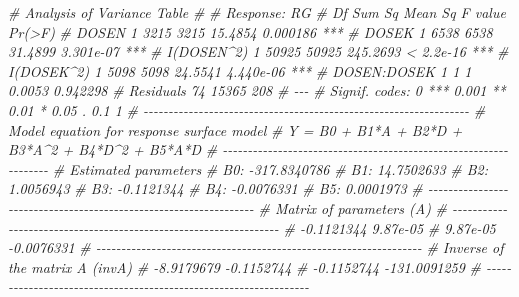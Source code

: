 \documentclass[
]{book}
\newenvironment{Shaded}{\begin{snugshade}}{\end{snugshade}}
\newcommand{\CommentTok}[1]{\textcolor[rgb]{0.56,0.35,0.01}{\textit{#1}}}
\numberwithin{equation}{section}
\begin{document}
\begin{Shaded}
\begin{Highlighting}[]
\CommentTok{\# Analysis of Variance Table}
\CommentTok{\# }
\CommentTok{\# Response: RG}
\CommentTok{\#             Df Sum Sq Mean Sq  F value    Pr(\textgreater{}F)    }
\CommentTok{\# DOSEN        1   3215    3215  15.4854  0.000186 ***}
\CommentTok{\# DOSEK        1   6538    6538  31.4899 3.301e{-}07 ***}
\CommentTok{\# I(DOSEN\^{}2)   1  50925   50925 245.2693 \textless{} 2.2e{-}16 ***}
\CommentTok{\# I(DOSEK\^{}2)   1   5098    5098  24.5541 4.440e{-}06 ***}
\CommentTok{\# DOSEN:DOSEK  1      1       1   0.0053  0.942298    }
\CommentTok{\# Residuals   74  15365     208                       }
\CommentTok{\# {-}{-}{-}}
\CommentTok{\# Signif. codes:  0 \textquotesingle{}***\textquotesingle{} 0.001 \textquotesingle{}**\textquotesingle{} 0.01 \textquotesingle{}*\textquotesingle{} 0.05 \textquotesingle{}.\textquotesingle{} 0.1 \textquotesingle{} \textquotesingle{} 1}
\CommentTok{\# {-}{-}{-}{-}{-}{-}{-}{-}{-}{-}{-}{-}{-}{-}{-}{-}{-}{-}{-}{-}{-}{-}{-}{-}{-}{-}{-}{-}{-}{-}{-}{-}{-}{-}{-}{-}{-}{-}{-}{-}{-}{-}{-}{-}{-}{-}{-}{-}{-}{-}{-}{-}{-}{-}{-}{-}{-}{-}{-}{-}{-}{-}{-}{-}{-}}
\CommentTok{\# Model equation for response surface model }
\CommentTok{\# Y = B0 + B1*A + B2*D + B3*A\^{}2 + B4*D\^{}2 + B5*A*D }
\CommentTok{\# {-}{-}{-}{-}{-}{-}{-}{-}{-}{-}{-}{-}{-}{-}{-}{-}{-}{-}{-}{-}{-}{-}{-}{-}{-}{-}{-}{-}{-}{-}{-}{-}{-}{-}{-}{-}{-}{-}{-}{-}{-}{-}{-}{-}{-}{-}{-}{-}{-}{-}{-}{-}{-}{-}{-}{-}{-}{-}{-}{-}{-}{-}{-}{-}{-}}
\CommentTok{\# Estimated parameters }
\CommentTok{\# B0: {-}317.8340786}
\CommentTok{\# B1: 14.7502633}
\CommentTok{\# B2: 1.0056943}
\CommentTok{\# B3: {-}0.1121344}
\CommentTok{\# B4: {-}0.0076331}
\CommentTok{\# B5: 0.0001973}
\CommentTok{\# {-}{-}{-}{-}{-}{-}{-}{-}{-}{-}{-}{-}{-}{-}{-}{-}{-}{-}{-}{-}{-}{-}{-}{-}{-}{-}{-}{-}{-}{-}{-}{-}{-}{-}{-}{-}{-}{-}{-}{-}{-}{-}{-}{-}{-}{-}{-}{-}{-}{-}{-}{-}{-}{-}{-}{-}{-}{-}{-}{-}{-}{-}{-}{-}{-}}
\CommentTok{\# Matrix of parameters (A) }
\CommentTok{\# {-}{-}{-}{-}{-}{-}{-}{-}{-}{-}{-}{-}{-}{-}{-}{-}{-}{-}{-}{-}{-}{-}{-}{-}{-}{-}{-}{-}{-}{-}{-}{-}{-}{-}{-}{-}{-}{-}{-}{-}{-}{-}{-}{-}{-}{-}{-}{-}{-}{-}{-}{-}{-}{-}{-}{-}{-}{-}{-}{-}{-}{-}{-}{-}{-}}
\CommentTok{\# {-}0.1121344    9.87e{-}05 }
\CommentTok{\# 9.87e{-}05    {-}0.0076331 }
\CommentTok{\# {-}{-}{-}{-}{-}{-}{-}{-}{-}{-}{-}{-}{-}{-}{-}{-}{-}{-}{-}{-}{-}{-}{-}{-}{-}{-}{-}{-}{-}{-}{-}{-}{-}{-}{-}{-}{-}{-}{-}{-}{-}{-}{-}{-}{-}{-}{-}{-}{-}{-}{-}{-}{-}{-}{-}{-}{-}{-}{-}{-}{-}{-}{-}{-}{-}}
\CommentTok{\# Inverse of the matrix A (invA) }
\CommentTok{\# {-}8.9179679    {-}0.1152744 }
\CommentTok{\# {-}0.1152744    {-}131.0091259 }
\CommentTok{\# {-}{-}{-}{-}{-}{-}{-}{-}{-}{-}{-}{-}{-}{-}{-}{-}{-}{-}{-}{-}{-}{-}{-}{-}{-}{-}{-}{-}{-}{-}{-}{-}{-}{-}{-}{-}{-}{-}{-}{-}{-}{-}{-}{-}{-}{-}{-}{-}{-}{-}{-}{-}{-}{-}{-}{-}{-}{-}{-}{-}{-}{-}{-}{-}{-}}

\end{Highlighting}
\end{Shaded}
\end{document}
